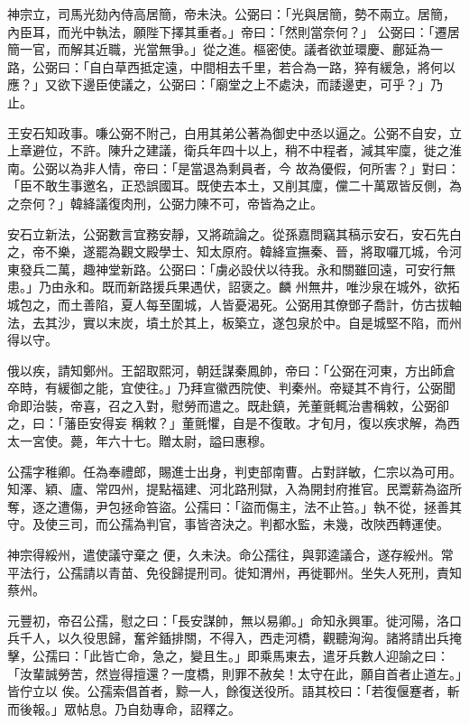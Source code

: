 \begin{pinyinscope}
 神宗立，司馬光劾內侍高居簡，帝未決。公弼曰：「光與居簡，勢不兩立。居簡，內臣耳，而光中執法，願陛下擇其重者。」帝曰：「然則當奈何？」
 公弼曰：「遷居簡一官，而解其近職，光當無爭。」從之進。樞密使。議者欲並環慶、鄜延為一路，公弼曰：「自白草西抵定遠，中間相去千里，若合為一路，猝有緩急，將何以應？」又欲下邊臣使議之，公弼曰：「廟堂之上不處決，而諉邊吏，可乎？」乃止。



 王安石知政事。嗛公弼不附己，白用其弟公著為御史中丞以逼之。公弼不自安，立上章避位，不許。陳升之建議，衛兵年四十以上，稍不中程者，減其牢廩，徙之淮南。公弼以為非人情，帝曰：「是當退為剩員者，今
 故為優假，何所害？」對曰：「臣不敢生事邀名，正恐誤國耳。既使去本土，又削其廩，儻二十萬眾皆反側，為之奈何？」韓絳議復肉刑，公弼力陳不可，帝皆為之止。



 安石立新法，公弼數言宜務安靜，又將疏論之。從孫嘉問竊其稿示安石，安石先白之，帝不樂，遂罷為觀文殿學士、知太原府。韓絳宣撫秦、晉，將取囉兀城，令河東發兵二萬，趣神堂新路。公弼曰：「虜必設伏以待我。永和關雖回遠，可安行無患。」乃由永和。既而新路援兵果遇伏，詔褒之。麟
 州無井，唯沙泉在城外，欲拓城包之，而土善陷，夏人每至圍城，人皆憂渴死。公弼用其僚鄧子喬計，仿古拔軸法，去其沙，實以末炭，墳土於其上，板築立，遂包泉於中。自是城堅不陷，而州得以守。



 俄以疾，請知鄭州。王韶取熙河，朝廷謀秦鳳帥，帝曰：「公弼在河東，方出師倉卒時，有緩御之能，宜使往。」乃拜宣徽西院使、判秦州。帝疑其不肯行，公弼聞命即治裝，帝喜，召之入對，慰勞而遣之。既赴鎮，羌董氈輒治書稱敕，公弼卻之，曰：「藩臣安得妄
 稱敕？」董氈懼，自是不復敢。才旬月，復以疾求解，為西太一宮使。薨，年六十七。贈太尉，謚曰惠穆。



 公孺字稚卿。任為奉禮郎，賜進士出身，判吏部南曹。占對詳敏，仁宗以為可用。知澤、穎、廬、常四州，提點福建、河北路刑獄，入為開封府推官。民鬻薪為盜所奪，逐之遭傷，尹包拯命笞盜。公孺曰：「盜而傷主，法不止笞。」執不從，拯善其守。及使三司，而公孺為判官，事皆咨決之。判都水監，未幾，改陜西轉運使。



 神宗得綏州，遣使議守棄之
 便，久未決。命公孺往，與郭逵議合，遂存綏州。常平法行，公孺請以青苗、免役歸提刑司。徙知渭州，再徙鄆州。坐失人死刑，責知蔡州。



 元豐初，帝召公孺，慰之曰：「長安謀帥，無以易卿。」命知永興軍。徙河陽，洛口兵千人，以久役思歸，奮斧鍤排關，不得入，西走河橋，觀聽洶洶。諸將請出兵掩擊，公孺曰：「此皆亡命，急之，變且生。」即乘馬東去，遣牙兵數人迎諭之曰：「汝輩誠勞苦，然豈得擅還？一度橋，則罪不赦矣！太守在此，願自首者止道左。」皆佇立以
 俟。公孺索倡首者，黥一人，餘復送役所。語其校曰：「若復偃蹇者，斬而後報。」眾帖息。乃自劾專命，詔釋之。




\end{pinyinscope}
